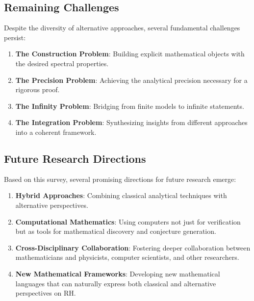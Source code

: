 \subsection{Remaining Challenges}

Despite the diversity of alternative approaches, several fundamental challenges persist:

\begin{enumerate}
\item \textbf{The Construction Problem}: Building explicit mathematical objects with the desired spectral properties.

\item \textbf{The Precision Problem}: Achieving the analytical precision necessary for a rigorous proof.

\item \textbf{The Infinity Problem}: Bridging from finite models to infinite statements.

\item \textbf{The Integration Problem}: Synthesizing insights from different approaches into a coherent framework.
\end{enumerate}

\subsection{Future Research Directions}

Based on this survey, several promising directions for future research emerge:

\begin{enumerate}
\item \textbf{Hybrid Approaches}: Combining classical analytical techniques with alternative perspectives.

\item \textbf{Computational Mathematics}: Using computers not just for verification but as tools for mathematical discovery and conjecture generation.

\item \textbf{Cross-Disciplinary Collaboration}: Fostering deeper collaboration between mathematicians and physicists, computer scientists, and other researchers.

\item \textbf{New Mathematical Frameworks}: Developing new mathematical languages that can naturally express both classical and alternative perspectives on RH.
\end{enumerate}

